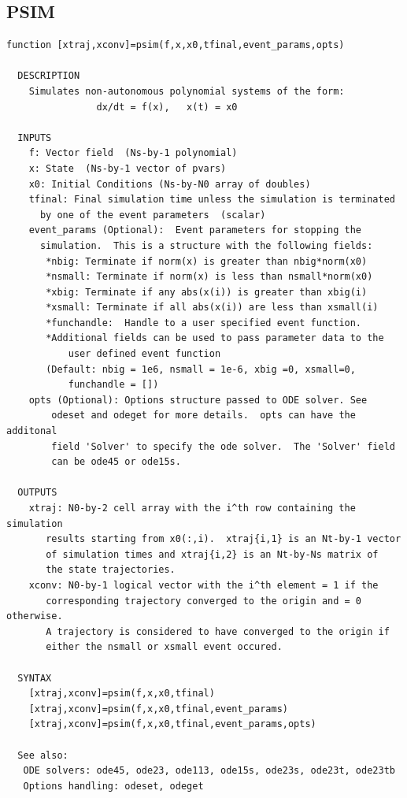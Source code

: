\documentclass{article}
\begin{document}
\newpage
\subsection{PSIM}
\begin{verbatim}
function [xtraj,xconv]=psim(f,x,x0,tfinal,event_params,opts)

  DESCRIPTION
    Simulates non-autonomous polynomial systems of the form:
                dx/dt = f(x),   x(t) = x0

  INPUTS
    f: Vector field  (Ns-by-1 polynomial)
    x: State  (Ns-by-1 vector of pvars)
    x0: Initial Conditions (Ns-by-N0 array of doubles)
    tfinal: Final simulation time unless the simulation is terminated
      by one of the event parameters  (scalar)
    event_params (Optional):  Event parameters for stopping the
      simulation.  This is a structure with the following fields:
       *nbig: Terminate if norm(x) is greater than nbig*norm(x0)
       *nsmall: Terminate if norm(x) is less than nsmall*norm(x0)
       *xbig: Terminate if any abs(x(i)) is greater than xbig(i)
       *xsmall: Terminate if all abs(x(i)) are less than xsmall(i)
       *funchandle:  Handle to a user specified event function.
       *Additional fields can be used to pass parameter data to the
           user defined event function
       (Default: nbig = 1e6, nsmall = 1e-6, xbig =0, xsmall=0,
           funchandle = [])
    opts (Optional): Options structure passed to ODE solver. See
        odeset and odeget for more details.  opts can have the additonal
        field 'Solver' to specify the ode solver.  The 'Solver' field
        can be ode45 or ode15s.

  OUTPUTS
    xtraj: N0-by-2 cell array with the i^th row containing the simulation
       results starting from x0(:,i).  xtraj{i,1} is an Nt-by-1 vector
       of simulation times and xtraj{i,2} is an Nt-by-Ns matrix of
       the state trajectories.
    xconv: N0-by-1 logical vector with the i^th element = 1 if the
       corresponding trajectory converged to the origin and = 0 otherwise.
       A trajectory is considered to have converged to the origin if
       either the nsmall or xsmall event occured.

  SYNTAX
    [xtraj,xconv]=psim(f,x,x0,tfinal)
    [xtraj,xconv]=psim(f,x,x0,tfinal,event_params)
    [xtraj,xconv]=psim(f,x,x0,tfinal,event_params,opts)

  See also:
   ODE solvers: ode45, ode23, ode113, ode15s, ode23s, ode23t, ode23tb
   Options handling: odeset, odeget

\end{verbatim}
\end{document}
